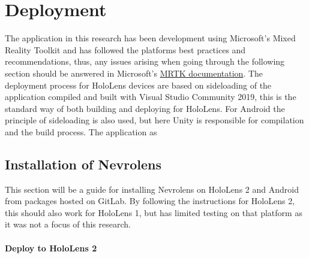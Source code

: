 \chapter{Deployment}

The application in this research has been development using Microsoft's Mixed Reality Toolkit and has followed the platforms best practices and recommendations, thus, any issues arising when going through the following section should be answered in Microsoft's \href{https://docs.microsoft.com/en-us/windows/mixed-reality/mrtk-unity}{MRTK documentation}. The deployment process for HoloLens devices are based on sideloading of the application compiled and built with Visual Studio Community 2019, this is the standard way of both building and deploying for HoloLens. For Android the principle of sideloading is also used, but here Unity is responsible for compilation and the build process. 
The application as 


\section{Installation of Nevrolens}

This section will be a guide for installing Nevrolens on HoloLens 2 and Android from packages hosted on GitLab.
By following the instructions for HoloLens 2, this should also work for HoloLens 1, but has limited testing on that platform as it was not a focus of this research.

\subsubsection{Deploy to HoloLens 2}

